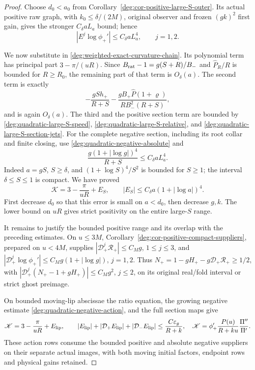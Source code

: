 \begin{proof}
Choose \(d_0<a_0\) from
Corollary~\ref{deg:cor-positive-large-S-outer}. Its actual positive
raw graph, with \(k_0\le\delta/(2M)\), original observer and frozen
\((gk)^2\) first gain, gives the stronger \(C_\delta aL_a\) bound;
hence
\begin{equation}\label{deg:quadratic-large-S-section-jets}
 |E^j\log\phi_+'|\le C_\delta aL_a^4,\qquad j=1,2.
\end{equation}

We now substitute in \eqref{deg:weighted-exact-curvature-chain}.  Its polynomial
term has principal part \(3-\pi/(uR)\).  Since
\(B_{\rm rat}-1=g(S+R)/B_-\) and
\(\widehat P_R/R\) is bounded for \(R\ge R_0\), the remaining
part of that term is \(O_\delta(a)\).  The second term is exactly
\[
 -\frac{gS h_+}{R+S}
 -\frac{gB_+\widehat P(1+\varrho)}{RB_-^2(R+S)},
\]
and is again \(O_\delta(a)\).  The third and the positive section
term are bounded by \eqref{deg:quadratic-large-S-speed},
\eqref{deg:quadratic-large-S-relative}, and
\eqref{deg:quadratic-large-S-section-jets}.  For the complete negative
section, including its root collar and finite closing, use
\eqref{deg:quadratic-negative-absolute} and
\[
 \frac{g(1+|\log g|)^4}{R+S}\le C_\delta aL_a^4.
\]
Indeed \(a=gS\), \(S\ge\delta\), and
\((1+\log S)^4/S^2\) is bounded for \(S\ge1\); the interval
\(\delta\le S\le1\) is compact.  We have proved
\begin{equation}
 \mathscr K=3-\frac{\pi}{uR}+E_S,\qquad
 |E_S|\le C_\delta a(1+|\log a|)^4.
 \label{deg:quadratic-large-S-curvature}
\end{equation}
First decrease \(d_0\) so that this error is small on \(a<d_0\),
then decrease \(g,k\).  The lower bound on \(uR\) gives strict
positivity on the entire large-\(S\) range.

It remains to justify the bounded positive range and its overlap with
the preceding estimates.  On \(u\le3M\), Corollary~\ref{deg:cor-positive-compact-suppliers},
prepared on \(u<4M\), supplies
\( |\mathcal D_+^j\mathcal R_+|\le C_Mg\), \(1\le j\le3\), and
\( |\mathcal D_+^j\log\phi_+'|\le C_Mg(1+|\log g|)\), \(j=1,2\).
Thus \(N_+=1-gH_+-g\mathcal D_+\mathcal R_+\ge1/2\), with
\(|\mathcal D_+^j(N_+-1+gH_+)|\le C_Mg^2\), \(j\le2\),
on its original real/fold interval or strict ghost preimage.

On bounded moving-lip abscissae the ratio
equation, the growing negative estimate
\eqref{deg:quadratic-negative-action}, and the full section maps give
\begin{equation}
 \mathscr K=3-\frac{\pi}{uR}+E_{\rm lip},\qquad
 |E_{\rm lip}|+|\mathcal D_+E_{\rm lip}|
                  +|\mathcal D_-E_{\rm lip}|
       \le\frac{C\varepsilon_g}{R+k},
 \quad
 \mathscr K=\phi_+'\frac{P(u)}{R+ku}\frac{\Pi''}{\Pi'}.
 \label{deg:quadratic-bounded-lip-curvature}
\end{equation}
These action rows consume the bounded positive and absolute
negative suppliers on their separate actual images, with both
moving initial factors, endpoint rows and physical gains retained.


\end{proof}
